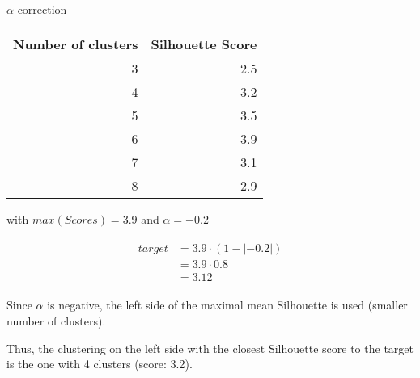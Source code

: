 \begin{example}
  \centering
  \caption{$\alpha$ correction}
  \label{ex:alpha_correction}

  \begin{tabular}{r r}
    \toprule
    Number of clusters & Silhouette Score \\
    \midrule
    3 & 2.5 \\
    4 & 3.2 \\
    5 & 3.5 \\
    6 & 3.9 \\
    7 & 3.1 \\
    8 & 2.9 \\
    \bottomrule
  \end{tabular}

  \vspace{0.5cm}

  \raggedright
  with $max(Scores) = 3.9$ and $\alpha = -0.2$

  \begin{gather*}
    \begin{aligned}
    target &= 3.9 \cdot (1 - |-0.2|) \\
           &= 3.9 \cdot 0.8 \\
           &= 3.12
     \end{aligned}
   \end{gather*}

  \vspace{0.5cm}

  Since $\alpha$ is negative, the left side of the maximal mean Silhouette is used (smaller number of clusters).

  Thus, the clustering on the left side with the closest Silhouette score to the target is the one with 4 clusters (score: 3.2).
\end{example}

\begin{table}
  \centering
  \caption{Silhouette-based clustering evaluation on retained rank lists, average  $B^3_{F_1}$/$r_{diff}$, $\alpha = -0.2$}
  \label{tab:silhouette-based_clustering_alpha}

\end{table}
